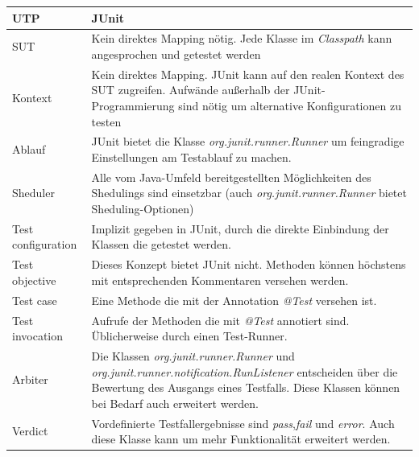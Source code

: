 
\begin{table}[h]

\centering
\begin{tabular}
{ | l |p{9cm}|} \hline
\textbf{UTP} & \textbf{JUnit} \\ \hline
SUT                       & Kein direktes Mapping nötig. Jede Klasse im \textit{Classpath} kann angesprochen und getestet werden   \\ \hline
Kontext                   & Kein direktes Mapping. JUnit kann auf den realen Kontext des SUT zugreifen. Aufwände außerhalb der JUnit-Programmierung sind nötig um alternative Konfigurationen zu testen \\ \hline
Ablauf         			  & JUnit bietet die Klasse \textit{org.junit.runner.Runner} um feingradige Einstellungen am Testablauf zu machen. \\ \hline
Sheduler                  & Alle vom Java-Umfeld bereitgestellten Möglichkeiten des Shedulings sind einsetzbar (auch \textit{org.junit.runner.Runner} bietet Sheduling-Optionen) \\ \hline
Test configuration        & Implizit gegeben in JUnit, durch die direkte Einbindung der Klassen die getestet werden. \\ \hline
Test objective            & Dieses Konzept bietet JUnit nicht. Methoden können höchstens mit entsprechenden Kommentaren versehen werden.\\ \hline
Test case                 & Eine Methode die mit der Annotation \textit{@Test} versehen ist. \\ \hline
Test invocation           & Aufrufe der Methoden die mit \textit{@Test} annotiert sind. Üblicherweise durch einen Test-Runner. \\ \hline
Arbiter                   & Die Klassen \textit{org.junit.runner.Runner} und \textit{org.junit.runner.notification.RunListener} entscheiden über die Bewertung des Ausgangs eines Testfalls. Diese Klassen können bei Bedarf auch erweitert werden. \\ \hline
Verdict                   & Vordefinierte Testfallergebnisse sind \textit{pass},\textit{fail} und \textit{error}. Auch diese Klasse kann um mehr Funktionalität erweitert werden. \\ \hline

\end{tabular}
\end{table}
